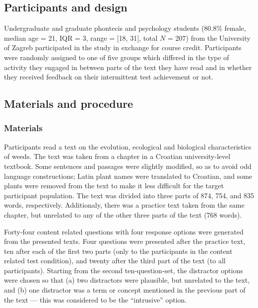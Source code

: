 \documentclass[11pt,]{article}
\title{}
\author{}
\date{}
\begin{document}
\hypertarget{participants-and-design}{%
\subsection{Participants and design}\label{participants-and-design}}

Undergraduate and graduate phontecis and psychology students (80.8\%
female, median age = 21, IQR = 3, range = {[}18, 31{]}, total \(N\) =
207) from the University of Zagreb participated in the study in exchange
for course credit. Participants were randomly assigned to one of five
groups which differed in the type of activity they engaged in between
parts of the text they have read and in whether they received feedback
on their intermittent test achievement or not.

\hypertarget{materials-and-procedure}{%
\subsection{Materials and procedure}\label{materials-and-procedure}}

\hypertarget{materials}{%
\subsubsection{Materials}\label{materials}}

Participants read a text on the evolution, ecological and biological
characteristics of weeds. The text was taken from a chapter in a
Croatian university-level textbook. Some sentences and passages were
slightly modified, so as to avoid odd language constructions; Latin
plant names were translated to Croatian, and some plants were removed
from the text to make it less difficult for the target participant
population. The text was divided into three parts of 874, 754, and 835
words, respectively. Additionaly, there was a practice text taken from
the same chapter, but unrelated to any of the other three parts of the
text (768 words).

Forty-four content related questions with four response options were
generated from the presented texts. Four questions were presented after
the practice text, ten after each of the first two parts (only to the
participants in the content related test condition), and twenty after
the third part of the text (to all participants). Starting from the
second ten-question-set, the distractor options were chosen so that (a)
two distractors were plausible, but unrelated to the text, and (b) one
distractor was a term or concept mentioned in the previous part of the
text --- this was considered to be the ``intrusive'' option.
\end{document}
